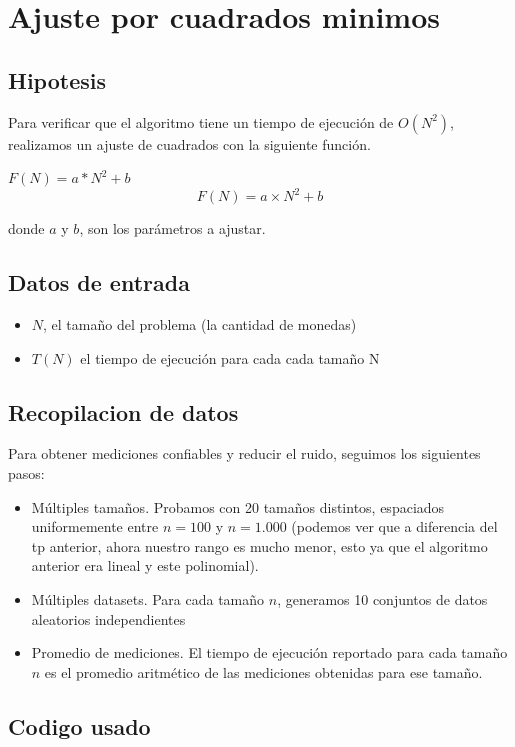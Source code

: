 \section{Ajuste por cuadrados minimos}

\subsection{Hipotesis}

Para verificar que el algoritmo tiene un tiempo de ejecución de $O(N^2)$, realizamos un ajuste de cuadrados con la siguiente función.

$F(N) = a * N^2 + b$
\[
F(N) = a \times N^2 + b
\]

donde $a$ y $b$, son los parámetros a ajustar.

\subsection{Datos de entrada}

\begin{itemize}
    \item $N$, el tamaño del problema (la cantidad de monedas)
    \item $T(N)$ el tiempo de ejecución para cada cada tamaño N
\end{itemize}

\subsection{Recopilacion de datos}

Para obtener mediciones confiables y reducir el ruido, seguimos los siguientes pasos:

\begin{itemize}
    \item Múltiples tamaños. Probamos con 20 tamaños distintos, espaciados uniformemente entre $n = 100$ y $n = 1.000$ (podemos ver que a diferencia del tp anterior, ahora nuestro rango es mucho menor, esto ya que el algoritmo anterior era lineal y este polinomial).
    \item Múltiples datasets. Para cada tamaño $n$, generamos 10 conjuntos de datos  aleatorios independientes
    \item Promedio de mediciones. El tiempo de ejecución reportado para cada tamaño $n$ es el promedio aritmético de las mediciones obtenidas para ese tamaño.
\end{itemize}   

\subsection{Codigo usado}

